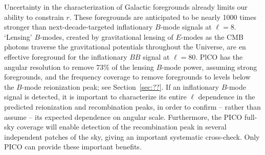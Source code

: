 \documentclass[PICOAPC.tex]{subfiles}
\begin{document}
Uncertainty in the characterization of Galactic foregrounds already limits our ability to constrain $r$. These foregrounds 
are anticipated to be nearly 1000 times stronger than next-decade-targeted inflationary $B$-mode signals at $\ell=8$. 
`Lensing' $B$-modes, created by gravitational lensing of $E$-modes as the CMB photons traverse the gravitational potentials throughout the Universe, are en effective foreground for the inflationary $BB$ signal at $\ell=80$.  
PlCO has the angular resolution to remove 73\% of the lensing $B$-mode power, assuming strong foregrounds, and the frequency coverage to remove foregrounds to levels below the $B$-mode reionization peak; see Section~\ref{sec:??}. 
If an inflationary $B$-mode signal is detected, it is important to characterize its entire $\ell$ dependence in the predicted reionization and  recombination peaks, in order to confirm -- rather than assume -- its expected dependence on angular scale.  Furthermore, the PICO full-sky coverage will enable detection of the recombination peak in several independent patches of the sky, giving an important systematic cross-check. Only PICO can provide these important benefits. 




\end{document}
